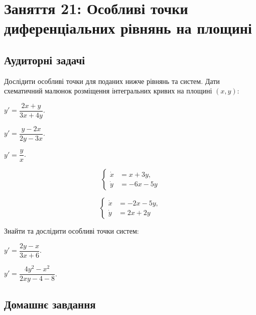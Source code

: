 \section*{Заняття 21: Особливі точки диференціальних рівнянь на площині}

\subsection*{Аудиторні задачі}

Дослідити особливі точки для поданих нижче рівнянь та систем. Дати схематичний малюнок розміщення інтегральних кривих на площині $(x, y)$:

\begin{problem}
	$y' = \dfrac{2 x + y}{3 x + 4 y}$.
\end{problem}

\begin{problem}
	$y' = \dfrac{y - 2 x}{2 y - 3 x}$.
\end{problem}

\begin{problem}
	$y' = \dfrac{y}{x}$.
\end{problem}

\begin{problem}
	\[\left\{ \begin{aligned} \dot x &= x + 3 y, \\ \dot y &= - 6 x - 5 y \end{aligned} \right.\]
\end{problem}

\begin{problem}
	\[\left\{ \begin{aligned} \dot x &= - 2 x - 5 y, \\ \dot y &= 2 x + 2 y \end{aligned} \right.\]
\end{problem}

Знайти та дослідити особливі точки систем:

\begin{problem}
	$y' = \dfrac{2 y - x}{3 x + 6}$.
\end{problem}

\begin{problem}
	$y' = \dfrac{4 y^2 - x^2}{2 x y - 4 - 8}$.
\end{problem}

\subsection*{Домашнє завдання}

